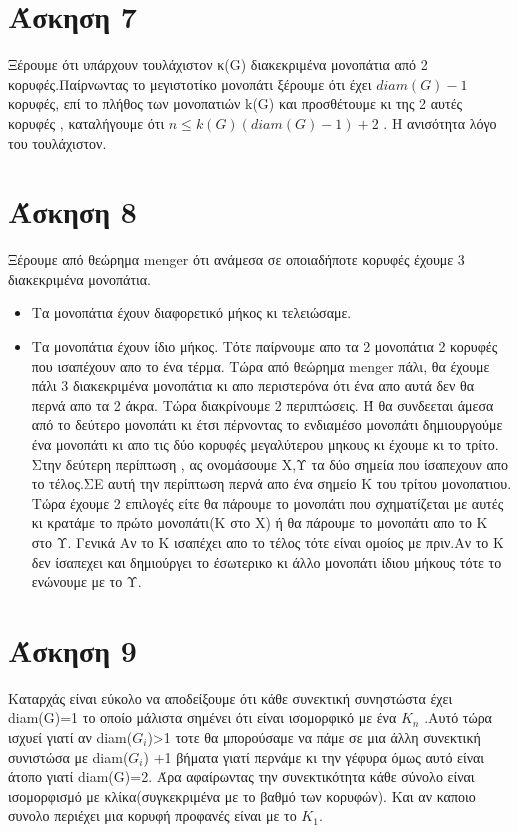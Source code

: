 \documentclass{article}
\begin{document}
    \section*{Άσκηση 7}
    Ξέρουμε ότι υπάρχουν  τουλάχιστον κ(G) διακεκριμένα μονοπάτια από 2 κορυφές.Παίρνωντας το μεγιστοτίκο μονοπάτι ξέρουμε ότι έχει $diam(G)-1$ κορυφές, επί το πλήθος των μονοπατιών k(G) και προσθέτουμε κι της 2 αυτές κορυφές , καταλήγουμε ότι $n\le k(G)(diam(G)-1) +2$ . Η ανισότητα λόγο του τουλάχιστον.
     \section*{Άσκηση 8}
     Ξέρουμε από θεώρημα menger ότι ανάμεσα σε οποιαδήποτε κορυφές έχουμε 3 διακεκριμένα μονοπάτια. 
     \begin{itemize}
     	\item
     	Τα μονοπάτια έχουν διαφορετικό μήκος κι τελειώσαμε.
     	\item
     	Τα μονοπάτια έχουν ίδιο μήκος. Τότε παίρνουμε απο τα 2 μονοπάτια 2 κορυφές που ισαπέχουν απο το ένα τέρμα.
     	Τώρα από θεώρημα menger πάλι, θα έχουμε πάλι 3 διακεκριμένα μονοπάτια  κι απο περιστερόνα ότι ένα απο αυτά δεν θα περνά απο τα 2 άκρα. Τώρα διακρίνουμε 2 περιπτώσεις. Ή θα συνδεεται άμεσα από το δεύτερο μονοπάτι κι έτσι πέρνοντας το ενδιαμέσο μονοπάτι δημιουργούμε ένα μονοπάτι κι απο τις δύο κορυφές μεγαλύτερου μηκους κι έχουμε κι το τρίτο. Στην δεύτερη περίπτωση , ας ονομάσουμε Χ,Υ τα δύο σημεία που ίσαπεχουν απο το τέλος.ΣΕ αυτή την περίπτωση περνά απο ένα σημείο Κ του τρίτου μονοπατιου. Τώρα έχουμε 2 επιλογές είτε θα πάρουμε το μονοπάτι που σχηματίζεται με αυτές κι κρατάμε το πρώτο μονοπάτι(Κ στο Χ) ή θα πάρουμε το μονοπάτι απο το Κ στο Υ. Γενικά Αν το Κ ισαπέχει απο το τέλος τότε είναι ομοίος με πριν.Αν το Κ δεν ίσαπεχει και δημιούργει το έσωτερικο κι άλλο μονοπάτι ίδιου μήκους τότε το ενώνουμε με το Υ.
     	\end{itemize}
     	 \section*{Άσκηση 9}
     	 Καταρχάς είναι εύκολο να αποδείξουμε ότι κάθε συνεκτική συνηστώστα έχει diam(G)=1 το οποίο μάλιστα σημένει ότι είναι ισομορφικό με ένα $K_n$ .Αυτό τώρα ισχυεί γιατί αν diam($G_i$)>1 τοτε θα μπορούσαμε να πάμε σε μια άλλη συνεκτική συνιστώσα με  diam($G_i$) +1 βήματα γιατί περνάμε κι την γέφυρα όμως αυτό είναι άτοπο γιατί diam(G)=2. Άρα αφαίρωντας την συνεκτικότητα κάθε σύνολο είναι ισομορφισμό με κλίκα(συγκεκριμένα με το βαθμό των κορυφών). Και αν καποιο συνολο περιέχει μια κορυφή προφανές είναι με το $K_1$.
\end{document}
